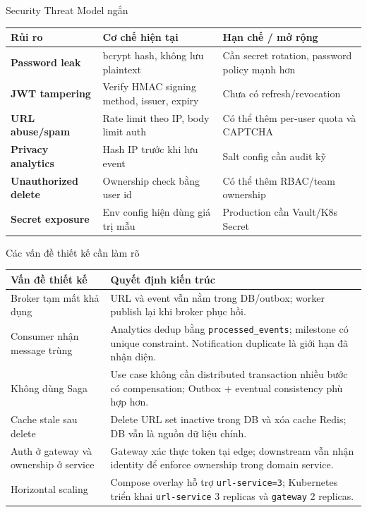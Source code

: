 \documentclass[aspectratio=169]{beamer}
\begin{document}
\begin{frame}{Security Threat Model ngắn}
    \scriptsize
    \begin{center}
    \begin{tabular}{>{\bfseries}p{}p{}p{}}
        \toprule
        Rủi ro & Cơ chế hiện tại & Hạn chế / mở rộng \\
        \midrule
        Password leak & bcrypt hash, không lưu plaintext & Cần secret rotation, password policy mạnh hơn \\
        JWT tampering & Verify HMAC signing method, issuer, expiry & Chưa có refresh/revocation \\
        URL abuse/spam & Rate limit theo IP, body limit auth & Có thể thêm per-user quota và CAPTCHA \\
        Privacy analytics & Hash IP trước khi lưu event & Salt config cần audit kỹ \\
        Unauthorized delete & Ownership check bằng user id & Có thể thêm RBAC/team ownership \\
        Secret exposure & Env config hiện dùng giá trị mẫu & Production cần Vault/K8s Secret \\
        \bottomrule
    \end{tabular}
    \end{center}
\end{frame}

\begin{frame}{Các vấn đề thiết kế cần làm rõ}
    \scriptsize
    \begin{center}
    \begin{tabular}{p{}p{}}
        \toprule
        Vấn đề thiết kế & Quyết định kiến trúc \\
        \midrule
        Broker tạm mất khả dụng & URL và event vẫn nằm trong DB/outbox; worker publish lại khi broker phục hồi. \\
        Consumer nhận message trùng & Analytics dedup bằng \texttt{processed\_events}; milestone có unique constraint. Notification duplicate là giới hạn đã nhận diện. \\
        Không dùng Saga & Use case không cần distributed transaction nhiều bước có compensation; Outbox + eventual consistency phù hợp hơn. \\
        Cache stale sau delete & Delete URL set inactive trong DB và xóa cache Redis; DB vẫn là nguồn dữ liệu chính. \\
        Auth ở gateway và ownership ở service & Gateway xác thực token tại edge; downstream vẫn nhận identity để enforce ownership trong domain service. \\
        Horizontal scaling & Compose overlay hỗ trợ \texttt{url-service=3}; Kubernetes triển khai \texttt{url-service} 3 replicas và \texttt{gateway} 2 replicas. \\
        \bottomrule
    \end{tabular}
    \end{center}
\end{frame}
\end{document}
